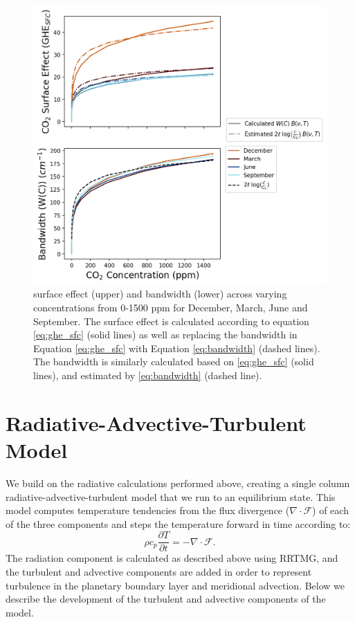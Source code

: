 \documentclass[draft]{agujournal2019}
\begin{document}
\begin{figure}[htb!]
\noindent\includegraphics[width=1\textwidth]{figures/sfc_bandwidth_and_co2.png}
\centering
\caption{ surface effect (upper) and bandwidth (lower) across varying  concentrations from 0-1500 ppm for December, March, June and September. The  surface effect is calculated according to equation \ref{eq:ghe_sfc} (solid lines) as well as replacing the bandwidth in Equation \ref{eq:ghe_sfc} with Equation \ref{eq:bandwidth} (dashed lines). The bandwidth is similarly calculated based on \ref{eq:ghe_sfc} (solid lines), and estimated by \ref{eq:bandwidth} (dashed line).}
\label{fig:sfc_bandwidth_co2}
\end{figure}


\section{Radiative-Advective-Turbulent Model}

We build on the radiative calculations performed above, creating a single column radiative-advective-turbulent model that we run to an equilibrium state. This model computes temperature tendencies from the flux divergence ($\nabla \cdot \mathcal{F}$) of each of the three components and steps the temperature forward in time according to:
\begin{equation}
    \rho c_{p} \frac{\partial T}{\partial t} = -\nabla \cdot \mathbf{\mathcal{F}}.
\end{equation}
The radiation component is calculated as described above using RRTMG, and the turbulent and advective components are added in order to represent turbulence in the planetary boundary layer and meridional advection. Below we describe the development of the turbulent and advective components of the model.
\end{document}
